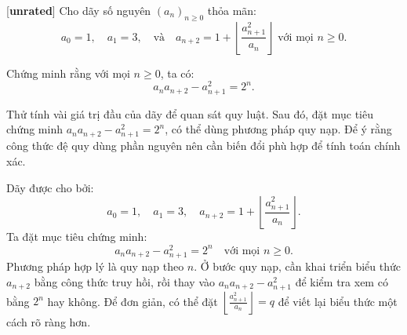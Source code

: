 \documentclass[../03-arithmetic-functions.tex]{subfiles}
\begin{document}
\begin{exercise*}\label{example:GBR-2015-TST-F2-P5}[\textbf{unrated}]
    Cho dãy số nguyên $(a_n)_{n \ge 0}$ thỏa mãn:
    \[
        a_0 = 1, \quad a_1 = 3, \quad \text{và} \quad a_{n+2} = 1 + \left\lfloor \frac{a_{n+1}^2}{a_n} \right\rfloor \text{ với mọi } n \ge 0.
    \]
    
    Chứng minh rằng với mọi \(n \ge 0\), ta có:
    \[
        a_n a_{n+2} - a_{n+1}^2 = 2^n.
    \]
\end{exercise*}

\begin{remark*}
    Thử tính vài giá trị đầu của dãy để quan sát quy luật. Sau đó, đặt mục tiêu chứng minh \( a_n a_{n+2} - a_{n+1}^2 = 2^n \), có thể dùng phương pháp quy nạp. Để ý rằng công thức đệ quy dùng phần nguyên nên cần biến đổi phù hợp để tính toán chính xác.
\end{remark*}

\begin{story*}
    Dãy được cho bởi:
    \[
        a_0 = 1,\quad a_1 = 3,\quad a_{n+2} = 1 + \left\lfloor \frac{a_{n+1}^2}{a_n} \right\rfloor.
    \]
    Ta đặt mục tiêu chứng minh:
    \[
        a_n a_{n+2} - a_{n+1}^2 = 2^n \quad \text{với mọi } n \ge 0.
    \]
    Phương pháp hợp lý là quy nạp theo \( n \). Ở bước quy nạp, cần khai triển biểu thức \( a_{n+2} \) bằng công thức truy hồi, rồi thay vào \( a_n a_{n+2} - a_{n+1}^2 \) để kiểm tra xem có bằng \( 2^n \) hay không. Để đơn giản, có thể đặt \( \left\lfloor \frac{a_{n+1}^2}{a_n} \right\rfloor = q \) để viết lại biểu thức một cách rõ ràng hơn.
\end{story*}
\end{document}
